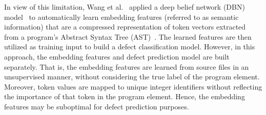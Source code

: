 
In view of this limitation, Wang et al.~\cite{wang2016automatically} applied a deep belief network (DBN) model~\cite{hinton2009deep} to automatically learn embedding features (referred to as semantic information) that are a compressed representation of token vectors extracted from a program's Abstract Syntax Tree (AST)~\cite{Hindle:2012:NS:2337223.2337322}. The learned features are then utilized as training input to build a defect classification model. However, in this approach, the embedding features and defect prediction model are built separately.
That is, the embedding features are learned from source files in an unsupervised manner, without considering the true label of the program element. Moreover, token values are mapped to unique integer identifiers without reflecting the importance of that token in the program element. Hence, the embedding features may be suboptimal for defect prediction purposes. 

